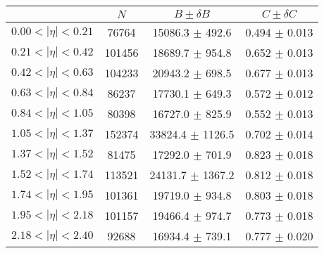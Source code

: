 \begin{tabular}{lccc}
\hline
    &   $N$   & $B \pm \delta B$  &  $C \pm \delta C$ \\
\hline
$0.00 < |\eta| <0.21$          & 76764      & 15086.3    $\pm$ 492.6 & 0.494      $\pm$ 0.013 \\
$0.21 < |\eta| <0.42$          & 101456     & 18689.7    $\pm$ 954.8 & 0.652      $\pm$ 0.013 \\
$0.42 < |\eta| <0.63$          & 104233     & 20943.2    $\pm$ 698.5 & 0.677      $\pm$ 0.013 \\
$0.63 < |\eta| <0.84$          & 86237      & 17730.1    $\pm$ 649.3 & 0.572      $\pm$ 0.012 \\
$0.84 < |\eta| <1.05$          & 80398      & 16727.0    $\pm$ 825.9 & 0.552      $\pm$ 0.013 \\
$1.05 < |\eta| <1.37$          & 152374     & 33824.4    $\pm$ 1126.5 & 0.702      $\pm$ 0.014 \\
$1.37 < |\eta| <1.52$          & 81475      & 17292.0    $\pm$ 701.9 & 0.823      $\pm$ 0.018 \\
$1.52 < |\eta| <1.74$          & 113521     & 24131.7    $\pm$ 1367.2 & 0.812      $\pm$ 0.018 \\
$1.74 < |\eta| <1.95$          & 101361     & 19719.0    $\pm$ 934.8 & 0.803      $\pm$ 0.018 \\
$1.95 < |\eta| <2.18$          & 101157     & 19466.4    $\pm$ 974.7 & 0.773      $\pm$ 0.018 \\
$2.18 < |\eta| <2.40$          & 92688      & 16934.4    $\pm$ 739.1 & 0.777      $\pm$ 0.020 \\
\hline
\end{tabular}
